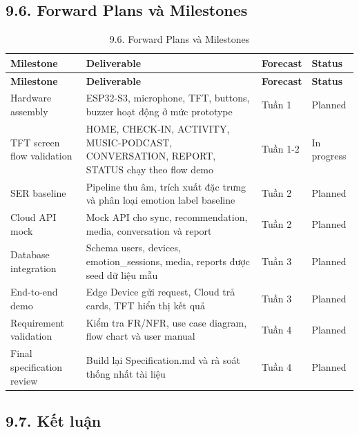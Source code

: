 \documentclass[12pt,a4paper]{article}
\begin{document}
\subsection*{9.6. Forward Plans và Milestones}

\begin{center}
\scriptsize
\begin{longtable}{|P{0.18\textwidth}|P{0.25\textwidth}|P{0.25\textwidth}|P{0.22\textwidth}|}
\caption{9.6. Forward Plans và Milestones}\\
\hline
\textbf{Milestone} & \textbf{Deliverable} & \textbf{Forecast} & \textbf{Status} \\
\hline
\endfirsthead
\hline
\textbf{Milestone} & \textbf{Deliverable} & \textbf{Forecast} & \textbf{Status} \\
\hline
\endhead
Hardware assembly & ESP32-S3, microphone, TFT, buttons, buzzer hoạt động ở mức prototype & Tuần 1 & Planned \\
\hline
TFT screen flow validation & HOME, CHECK-IN, ACTIVITY, MUSIC-PODCAST, CONVERSATION, REPORT, STATUS chạy theo flow demo & Tuần 1-2 & In progress \\
\hline
SER baseline & Pipeline thu âm, trích xuất đặc trưng và phân loại emotion label baseline & Tuần 2 & Planned \\
\hline
Cloud API mock & Mock API cho sync, recommendation, media, conversation và report & Tuần 2 & Planned \\
\hline
Database integration & Schema users, devices, emotion\_sessions, media, reports được seed dữ liệu mẫu & Tuần 3 & Planned \\
\hline
End-to-end demo & Edge Device gửi request, Cloud trả cards, TFT hiển thị kết quả & Tuần 3 & Planned \\
\hline
Requirement validation & Kiểm tra FR/NFR, use case diagram, flow chart và user manual & Tuần 4 & Planned \\
\hline
Final specification review & Build lại Specification.md và rà soát thống nhất tài liệu & Tuần 4 & Planned \\
\hline
\end{longtable}
\normalsize
\end{center}

\subsection*{9.7. Kết luận}
\end{document}
